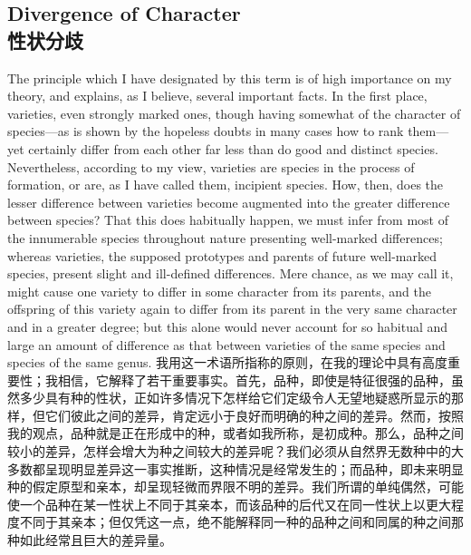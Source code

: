 \subsection*{Divergence of Character\\性状分歧}

\darwinpair
{The principle which I have designated by this term is of high importance on my theory, and explains, as I believe, several important facts. In the first place, varieties, even strongly marked ones, though having somewhat of the character of species—as is shown by the hopeless doubts in many cases how to rank them—yet certainly differ from each other far less than do good and distinct species. Nevertheless, according to my view, varieties are species in the process of formation, or are, as I have called them, incipient species. How, then, does the lesser difference between varieties become augmented into the greater difference between species? That this does habitually happen, we must infer from most of the innumerable species throughout nature presenting well-marked differences; whereas varieties, the supposed prototypes and parents of future well-marked species, present slight and ill-defined differences. Mere chance, as we may call it, might cause one variety to differ in some character from its parents, and the offspring of this variety again to differ from its parent in the very same character and in a greater degree; but this alone would never account for so habitual and large an amount of difference as that between varieties of the same species and species of the same genus.}
{我用这一术语所指称的原则，在我的理论中具有高度重要性；我相信，它解释了若干重要事实。首先，品种，即使是特征很强的品种，虽然多少具有种的性状，正如许多情况下怎样给它们定级令人无望地疑惑所显示的那样，但它们彼此之间的差异，肯定远小于良好而明确的种之间的差异。然而，按照我的观点，品种就是正在形成中的种，或者如我所称，是初成种。那么，品种之间较小的差异，怎样会增大为种之间较大的差异呢？我们必须从自然界无数种中的大多数都呈现明显差异这一事实推断，这种情况是经常发生的；而品种，即未来明显种的假定原型和亲本，却呈现轻微而界限不明的差异。我们所谓的单纯偶然，可能使一个品种在某一性状上不同于其亲本，而该品种的后代又在同一性状上以更大程度不同于其亲本；但仅凭这一点，绝不能解释同一种的品种之间和同属的种之间那种如此经常且巨大的差异量。}

